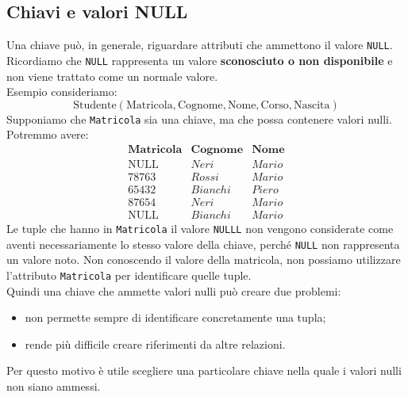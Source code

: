 \subsection{Chiavi e valori NULL}
Una chiave può, in generale, riguardare attributi che ammettono il valore
\texttt{NULL}.
Ricordiamo che \texttt{NULL} rappresenta un valore
\textbf{sconosciuto o non disponibile} e non viene trattato come un
normale valore.\\
\textcolor{verdeEsempio}{Esempio} consideriamo:
\[
\text{Studente}(
\text{Matricola},
\text{Cognome},
\text{Nome},
\text{Corso},
\text{Nascita})
\]
Supponiamo che \texttt{Matricola} sia una chiave, ma che possa contenere
valori nulli.\\
Potremmo avere:
\[
\begin{array}{c|c|c}
\textbf{Matricola} & \textbf{Cognome} & \textbf{Nome} \\ \hline
\text{NULL} & Neri & Mario \\
78763 & Rossi & Mario \\
65432 & Bianchi & Piero \\
87654 & Neri & Mario \\
\text{NULL} & Bianchi & Mario
\end{array}
\]
Le tuple che hanno in \texttt{Matricola} il valore \texttt{NULLL} non vengono considerate come aventi necessariamente lo stesso valore
della chiave, perché \texttt{NULL} non rappresenta un valore noto.
Non conoscendo il valore della matricola, non possiamo utilizzare
l'attributo \texttt{Matricola} per identificare quelle tuple.\\
Quindi una chiave che ammette valori nulli può creare due problemi:
\begin{itemize}
    \item non permette sempre di identificare concretamente una tupla;
    \item rende più difficile creare riferimenti da altre relazioni.
\end{itemize}
Per questo motivo è utile scegliere una particolare chiave nella quale
i valori nulli non siano ammessi.


